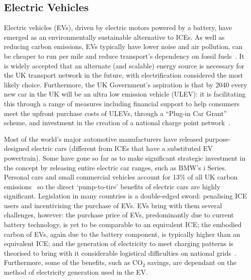 \documentclass[b5paper,10pt]{article}
\begin{document}
\subsection{Electric Vehicles}

Electric vehicles (EVs), driven by electric motors powered by a
battery, have emerged as an environmentally sustainable alternative to
ICEs. As well as reducing carbon emissions, EVs typically have lower
noise and air pollution, can be cheaper to run per mile and reduce
transport's dependency on fossil fuels~\citep{postevs:2010}. It is
widely accepted that an alternate (and scalable) energy source is
necessary for the UK transport network in the future, with
electrification considered the most likely choice. Furthermore, the UK
Government's aspiration is that by 2040 every new car in the UK will
be an ultra low emission vehicle (ULEV): it is facilitating this
through a range of measures including financial support to help
consumers meet the upfront purchase costs of ULEVs, through a
``Plug-in Car Grant'' scheme, and investment in the creation of a
national charge point network~\citep{brook:2015}.

Most of the world's major automotive manufacturers have released
purpose-designed electric cars (different from ICEs that have a
substituted EV powertrain). Some have gone so far as to make
significant strategic investment in the concept by releasing entire
electric car ranges, such as BMW's i Series. Personal cars and small
commercial vehicles account for 13\% of all UK carbon
emissions~\citep{lumsden:2012} so the direct `pump-to-tire' benefits
of electric cars are highly significant. Legislation in many countries
is a double-edged sword: penalising ICE users and incentivising the
purchase of EVs. EVs bring with them several challenges, however: the
purchase price of EVs, predominantly due to current battery
technology, is yet to be comparable to an equivalent ICE; the embodied
carbon of EVs, again due to the battery component, is typically higher
than an equivalent ICE; and the generation of electricity to meet
charging patterns is theorised to bring with it considerable
logistical difficulties on national
grids~\citep{su-et-al:2011,akhavan-rezai-et-al:2015}. Furthermore,
some of the benefits, such as CO$_2$ savings, are dependant on the
method of electricity generation used in the EV.
\end{document}
